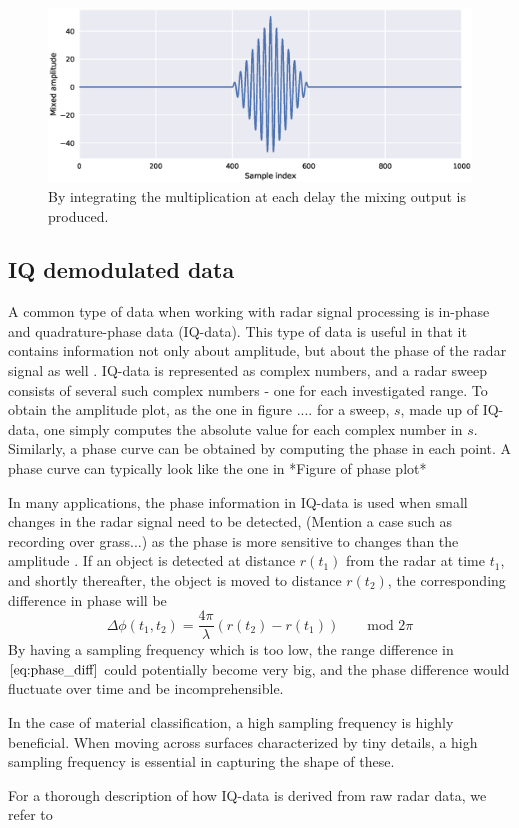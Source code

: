 \begin{figure}[h]
	\centering
	\includegraphics[scale=0.5]{figs_temp/mixing2}
	\caption{By integrating the multiplication at each delay the mixing output is produced.}
	\label{fig:mix2}
\end{figure}



\subsection{IQ demodulated data}
A common type of data when working with radar signal processing is in-phase and quadrature-phase data (IQ-data).  This type of data is useful in that it contains information not only about amplitude, but about the phase of the radar signal as well \citep{richards_2014}. IQ-data is represented as complex numbers, and a radar sweep consists of several such complex numbers - one for each investigated range. To obtain the amplitude plot, as the one in figure .... for a sweep, $s$, made up of IQ-data, one simply computes the absolute value for each complex number in $s$. Similarly, a phase curve can be obtained by computing the phase in each point. A phase curve can typically look like the one in *Figure of phase plot*

In many applications, the phase information in IQ-data is used when small changes in the radar signal need to be detected, (Mention a case such as recording over grass...) as the phase is more sensitive to changes than the amplitude \citep{lien_gillian_karagozler_amihood_schwesig_olson_raja_poupyrev_2016}. If an object is detected at distance $r(t_1)$ from the radar at time $t_1$, and shortly thereafter, the object is moved to distance $r(t_2)$, the corresponding difference in phase will be
\begin{equation}
	\label{eq:phase_diff}
	\Delta\phi(t_1, t_2)=\frac{4\pi}{\lambda}(r(t_2)-r(t_1)) \quad\quad \textrm{mod 2$\pi$}
\end{equation}
By having a sampling frequency which is too low, the range difference in $\eqref{eq:phase_diff}$ could potentially become very big, and the phase difference would fluctuate over time and be incomprehensible.

In the case of material classification, a high sampling frequency is highly beneficial. When moving across surfaces characterized by tiny details, a high sampling frequency is essential in capturing the shape of these.

For a thorough description of how IQ-data is derived from raw radar data, we refer to \citep{richards_2014}


